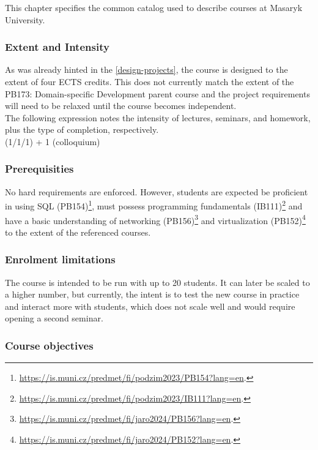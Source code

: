\documentclass[
  digital,
  color,
  oneside,
  nosansbold,
  nocolorbold,
  nolof,
  nolot,
]{fithesis4}
\begin{document}
This chapter specifies the common catalog used to describe courses at Masaryk University. 

\subsubsection{Extent and Intensity}

As was already hinted in the \cref{design-projects}, the course is designed to the extent of four ECTS credits. This does not currently match the extent of the PB173: Domain-specific Development parent course and the project requirements will need to be relaxed until the course becomes independent. \\

\noindent
The following expression notes the intensity of lectures, seminars, and homework, plus the type of completion, respectively. \\

\noindent
(1/1/1) + 1 (colloquium)

\subsubsection{Prerequisities}

No hard requirements are enforced. However, students are expected be proficient in using SQL (PB154)\footnote{ \url{https://is.muni.cz/predmet/fi/podzim2023/PB154?lang=en}.}, must possess programming fundamentals (IB111)\footnote{ \url{https://is.muni.cz/predmet/fi/podzim2023/IB111?lang=en}.} and have a basic understanding of networking (PB156)\footnote{\url{https://is.muni.cz/predmet/fi/jaro2024/PB156?lang=en}.} and virtualization (PB152)\footnote{\url{https://is.muni.cz/predmet/fi/jaro2024/PB152?lang=en}.} to the extent of the referenced courses.

\subsubsection{Enrolment limitations}

The course is intended to be run with up to 20 students. It can later be scaled to a higher number, but currently, the intent is to test the new course in practice and interact more with students, which does not scale well and would require opening a second seminar.

\subsubsection{Course objectives}
\end{document}
